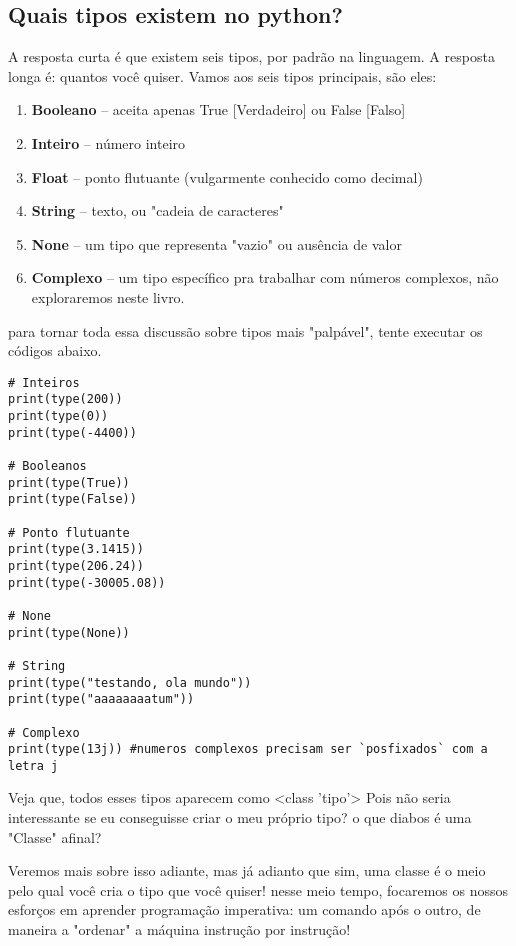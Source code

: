\documentclass[12pt]{book}
\begin{document}
	\subsection{Quais tipos existem no python?}
	
	A resposta curta é que existem seis tipos, por padrão na linguagem.\newline
	A resposta longa é: quantos você quiser.
	Vamos aos seis tipos principais, são eles:
	\begin{enumerate}
		\item \textbf{Booleano} -- aceita apenas True [Verdadeiro] ou False [Falso]
		\item \textbf{Inteiro} -- número inteiro
		\item \textbf{Float} -- ponto flutuante (vulgarmente conhecido como decimal)
		\item \textbf{String} -- texto, ou "cadeia de caracteres"
		\item \textbf{None} -- um tipo que representa "vazio" ou ausência de valor
		\item \textbf{Complexo} -- um tipo específico pra trabalhar com números complexos, não exploraremos neste livro.
	\end{enumerate}
	
	para tornar toda essa discussão sobre tipos mais "palpável", tente executar os códigos abaixo.
	
	\begin{lstlisting}
# Inteiros
print(type(200))
print(type(0))
print(type(-4400))

# Booleanos
print(type(True))
print(type(False))

# Ponto flutuante
print(type(3.1415))
print(type(206.24))
print(type(-30005.08))

# None
print(type(None))

# String
print(type("testando, ola mundo"))
print(type("aaaaaaaatum"))

# Complexo
print(type(13j)) #numeros complexos precisam ser `posfixados` com a letra j
	\end{lstlisting}
	
	Veja que, todos esses tipos aparecem como <class 'tipo'> \newline
	Pois não seria interessante se eu conseguisse criar o meu próprio tipo? o que diabos é uma "Classe" afinal? \newline
	
	Veremos mais sobre isso adiante, mas já adianto que sim, uma classe é o meio pelo qual você cria o tipo que você quiser! nesse meio tempo, focaremos os nossos esforços em aprender programação imperativa: um comando após o outro, de maneira a "ordenar" a máquina instrução por instrução!
	
\end{document}
